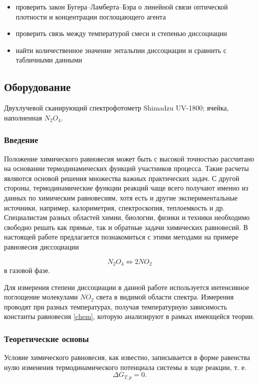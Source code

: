 \documentclass[a4paper,12pt]{article} %
\begin{document}
\begin{itemize}
	\item проверить закон Бугера--Ламберта--Бэра о линейной связи оптической плотности и концентрации поглощающего агента
	\item проверить связь между температурой смеси и степенью диссоциации
	\item найти количественное значение энтальпии диссоциации и сравнить с табличными данными
\end{itemize}




\subsection*{Оборудование}
Двухлучевой сканирующий спектрофотометр Shimadzu UV-1800; ячейка, наполненная \(N_2O_4\).

\subsubsection*{Введение}

Положение химического равновесия может быть с высокой точностью рассчитано на основании термодинамических функций участников процесса. Такие расчеты являются основой решения множества важных практических задач. С другой стороны, термодинамические функции реакций чаще всего получают именно из данных по химическим равновесиям, хотя есть и другие экспериментальные источники, например, калориметрия, спектроскопия, теплоемкость и др. Специалистам разных областей химии, биологии, физики и техники необходимо свободно решать как прямые, так и обратные задачи химических равновесий.
В настоящей работе предлагается познакомиться с этими методами на примере равновесия диссоциации

\begin{equation}\label{chem}
N_2O_4 \Leftrightarrow 2NO_2
\end{equation}
в газовой фазе.

Для измерения степени диссоциации в данной работе используется интенсивное поглощение молекулами \(NO_2\) света в видимой области спектра. Измерения проводят при разных температурах, получая температурную зависимость константы равновесия \eqref{chem}, которую анализируют в рамках имеющейся теории.

\subsubsection*{Теоретические основы}
Условие химического равновесия, как известно, записывается в форме равенства нулю изменения термодинамического потенциала системы в ходе реакции, т. е.
\begin{equation}
 \Delta G_{T,p}  = 0.
\end{equation}	
\end{document}
